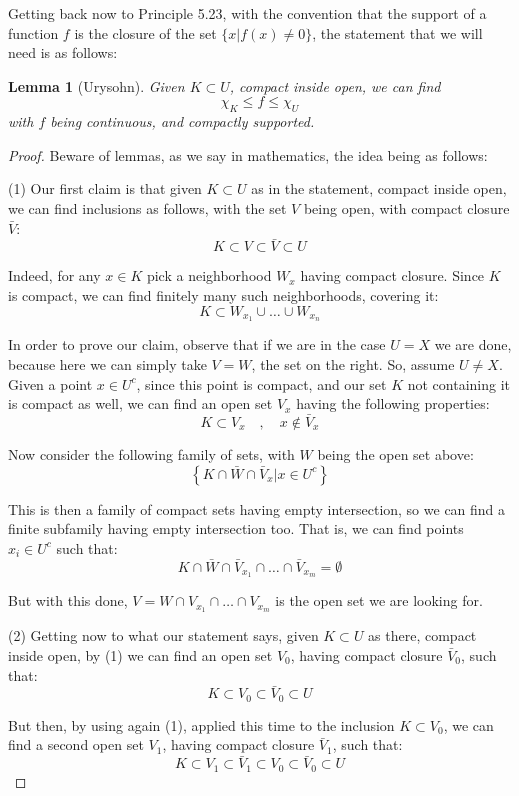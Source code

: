 \documentclass[12pt]{amsbook}
\newtheorem{lemma}[theorem]{Lemma}
\begin{document}
Getting back now to Principle 5.23, with the convention that the support of a function $f$ is the closure of the set $\{x|f(x)\neq0\}$, the statement that we will need is as follows:

\begin{lemma}[Urysohn]
Given $K\subset U$, compact inside open, we can find
$$\chi_K\leq f\leq\chi_U$$
with $f$ being continuous, and compactly supported.
\end{lemma}

\begin{proof}
Beware of lemmas, as we say in mathematics, the idea being as follows:

\medskip

(1) Our first claim is that given $K\subset U$ as in the statement, compact inside open, we can find inclusions as follows, with the set $V$ being open, with compact closure $\bar{V}$:
$$K\subset V\subset\bar{V}\subset U$$

Indeed, for any $x\in K$ pick a neighborhood $W_x$ having compact closure. Since $K$ is compact, we can find finitely many such neighborhoods, covering it:
$$K\subset W_{x_1}\cup\ldots\cup W_{x_n}$$

In order to prove our claim, observe that if we are in the case $U=X$ we are done, because here we can simply take $V=W$, the set on the right. So, assume $U\neq X$. Given a point $x\in U^c$, since this point is compact, and our set $K$ not containing it is compact as well, we can find an open set $V_x$ having the following properties:
$$K\subset V_x\quad,\quad x\notin\bar{V}_x$$

Now consider the following family of sets, with $W$ being the open set above:
$$\left\{K\cap\bar{W}\cap\bar{V}_x\Big|x\in U^c\right\}$$

This is then a family of compact sets having empty intersection, so we can find a finite subfamily having empty intersection too. That is, we can find points $x_i\in U^c$ such that:
$$K\cap\bar{W}\cap\bar{V}_{x_1}\cap\ldots\cap\bar{V}_{x_m}=\emptyset$$

But with this done, $V=W\cap V_{x_1}\cap\ldots\cap V_{x_m}$ is the open set we are looking for.

\medskip

(2) Getting now to what our statement says, given $K\subset U$ as there, compact inside open, by (1) we can find an open set $V_0$, having compact closure $\bar{V}_0$, such that:
$$K\subset V_0\subset\bar{V}_0\subset U$$

But then, by using again (1), applied this time to the inclusion $K\subset V_0$, we can find a second open set $V_1$, having compact closure $\bar{V}_1$, such that:
$$K\subset V_1\subset\bar{V}_1\subset V_0\subset\bar{V}_0\subset U$$


\end{proof}
\end{document}
